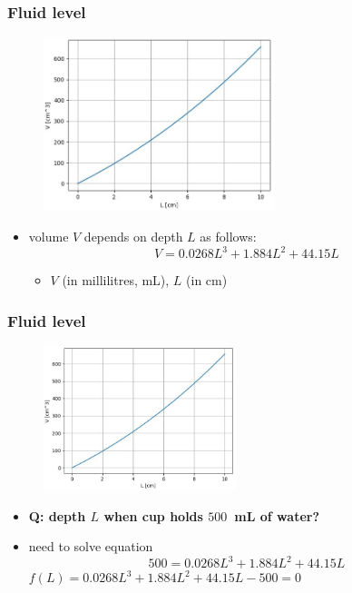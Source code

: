 \documentclass[english,14pt]{beamer}
\begin{document}
\begin{frame}[fragile]

\frametitle{Fluid level}

\vspace*{-4mm}
\begin{figure}[ht]
	\centering
	\includegraphics[width=0.6\textwidth]{figures/fluidVvsL}
\end{figure}
\vspace*{-4mm}
\begin{itemize}
	\item volume $V$ depends on depth $L$ as follows: %
	\[
		V = 0.0268L^3 + 1.884L^2 + 44.15L
	\]
	\vspace*{-4mm}
	\begin{itemize}
		\item $V$ (in millilitres, mL),  $L$ (in cm) 
	\end{itemize}
\end{itemize}
	
\end{frame}


\begin{frame}[fragile]

\frametitle{Fluid level}

\vspace*{-4mm}
\begin{figure}[ht]
	\centering
	\includegraphics[width=0.5\textwidth]{figures/fluidVvsL}
\end{figure}
\vspace*{-4mm}
\begin{itemize}
	\item[] \textbf{Q: depth $L$ when cup holds $500$~mL of water?}
	\item need to solve equation
	\[
	500 = 0.0268L^3 + 1.884L^2 + 44.15L
	\]
	$f(L) = 0.0268L^3 + 1.884L^2 + 44.15L - 500 = 0$
\end{itemize}
	
\end{frame}
\end{document}
